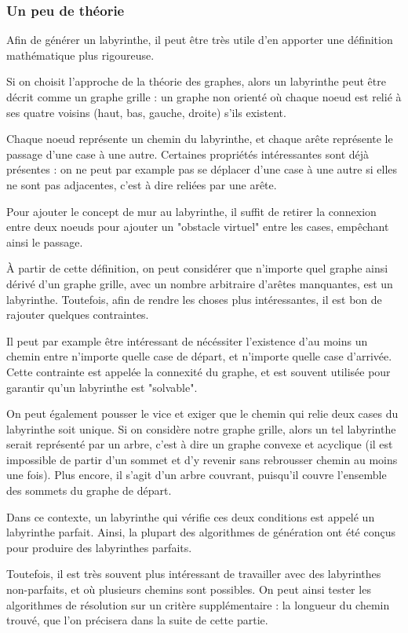 \documentclass[12pt]{scrreprt} %
\begin{document}
\subsubsection{Un peu de théorie}

Afin de générer un labyrinthe, il peut être très utile d'en apporter une définition mathématique plus rigoureuse.

Si on choisit l'approche de la théorie des graphes, alors un labyrinthe peut être décrit comme un graphe grille : un graphe non orienté où chaque noeud est relié à ses quatre voisins (haut, bas, gauche, droite) s'ils existent.

Chaque noeud représente un chemin du labyrinthe, et chaque arête représente le passage d'une case à une autre. Certaines propriétés intéressantes sont déjà présentes : on ne peut par example pas se déplacer d'une case à une autre si elles ne sont pas adjacentes, c'est à dire reliées par une arête.

Pour ajouter le concept de mur au labyrinthe, il suffit de retirer la connexion entre deux noeuds pour ajouter un "obstacle virtuel" entre les cases, empêchant ainsi le passage.

À partir de cette définition, on peut considérer que n'importe quel graphe ainsi dérivé d'un graphe grille, avec un nombre arbitraire d'arêtes manquantes, est un labyrinthe. Toutefois, afin de rendre les choses plus intéressantes, il est bon de rajouter quelques contraintes.

Il peut par example être intéressant de nécéssiter l'existence d'au moins un chemin entre n'importe quelle case de départ, et n'importe quelle case d'arrivée. Cette contrainte est appelée la connexité du graphe, et est souvent utilisée pour garantir qu'un labyrinthe est "solvable".

On peut également pousser le vice et exiger que le chemin qui relie deux cases du labyrinthe soit unique. Si on considère notre graphe grille, alors un tel labyrinthe serait représenté par un arbre, c'est à dire un graphe convexe et acyclique (il est impossible de partir d'un sommet et d'y revenir sans rebrousser chemin au moins une fois). Plus encore, il s'agit d'un arbre couvrant, puisqu'il couvre l'ensemble des sommets du graphe de départ.

Dans ce contexte, un labyrinthe qui vérifie ces deux conditions est appelé un labyrinthe parfait. Ainsi, la plupart des algorithmes de génération ont été conçus pour produire des labyrinthes parfaits.

Toutefois, il est très souvent plus intéressant de travailler avec des labyrinthes non-parfaits, et où plusieurs chemins sont possibles. On peut ainsi tester les algorithmes de résolution sur un critère supplémentaire : la longueur du chemin trouvé, que l'on précisera dans la suite de cette partie.
\end{document}
